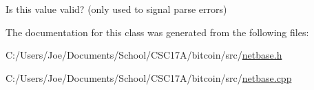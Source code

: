 Is this value valid? (only used to signal parse errors) 



The documentation for this class was generated from the following files\+:\begin{DoxyCompactItemize}
\item 
C\+:/\+Users/\+Joe/\+Documents/\+School/\+C\+S\+C17\+A/bitcoin/src/\hyperlink{netbase_8h}{netbase.\+h}\item 
C\+:/\+Users/\+Joe/\+Documents/\+School/\+C\+S\+C17\+A/bitcoin/src/\hyperlink{netbase_8cpp}{netbase.\+cpp}\end{DoxyCompactItemize}

